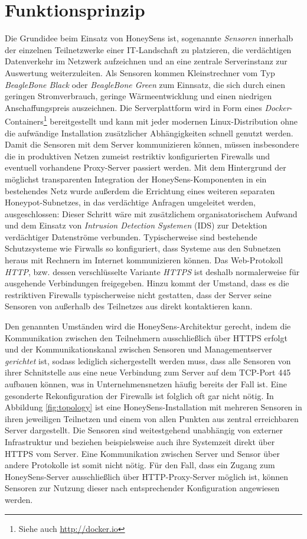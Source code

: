 \documentclass[12pt]{article}
\begin{document}
\part{Funktionsprinzip}
Die Grundidee beim Einsatz von HoneySens ist, sogenannte \textit{Sensoren} innerhalb der einzelnen Teilnetzwerke einer IT-Landschaft zu platzieren, die verdächtigen Datenverkehr im Netzwerk aufzeichnen und an eine zentrale Serverinstanz zur Auswertung weiterzuleiten. Als Sensoren kommen Kleinstrechner vom Typ \textit{BeagleBone Black} oder \textit{BeagleBone Green} zum Einnsatz, die sich durch einen geringen Stromverbrauch, geringe Wärmeentwicklung und einen niedrigen Anschaffungspreis auszeichnen. Die Serverplattform wird in Form eines \textit{Docker}-Containers\footnote{Siehe auch \url{http://docker.io}} bereitgestellt und kann mit jeder modernen Linux-Distribution ohne die aufwändige Installation zusätzlicher Abhängigkeiten schnell genutzt werden. Damit die Sensoren mit dem Server kommunizieren können, müssen insbesondere die in produktiven Netzen zumeist restriktiv konfigurierten Firewalls und eventuell vorhandene Proxy-Server passiert werden. Mit dem Hintergrund der möglichst transparenten Integration der HoneySens-Komponenten in ein bestehendes Netz wurde außerdem die Errichtung eines weiteren separaten Honeypot-Subnetzes, in das verdächtige Anfragen umgeleitet werden, ausgeschlossen: Dieser Schritt wäre mit zusätzlichem organisatorischem Aufwand und dem Einsatz von \textit{Intrusion Detection Systemen} (IDS) zur Detektion verdächtiger Datenströme verbunden. Typischerweise sind bestehende Schutzsysteme wie Firwalls so konfiguriert, dass Systeme aus den Subnetzen heraus mit Rechnern im Internet kommunizieren können. Das Web-Protokoll \textit{HTTP}, bzw. dessen verschlüsselte Variante \textit{HTTPS} ist deshalb normalerweise für ausgehende Verbindungen freigegeben. Hinzu kommt der Umstand, dass es die restriktiven Firewalls typischerweise nicht gestatten, dass der Server seine Sensoren von außerhalb des Teilnetzes aus direkt kontaktieren kann.

Den genannten Umständen wird die HoneySens-Architektur gerecht, indem die Kommunikation zwischen den Teilnehmern ausschließlich über HTTPS erfolgt und der Kommunikationskanal zwischen Sensoren und Managementserver \textit{gerichtet} ist, sodass lediglich sichergestellt werden muss, dass alle Sensoren von ihrer Schnitstelle aus eine neue Verbindung zum Server auf dem TCP-Port 445 aufbauen können, was in Unternehmensnetzen häufig bereits der Fall ist. Eine gesonderte Rekonfiguration der Firewalls ist folglich oft gar nicht nötig. In Abbildung \ref{fig:topology} ist eine HoneySens-Installation mit mehreren Sensoren in ihren jeweiligen Teilnetzen und einem von allen Punkten aus zentral erreichbaren Server dargestellt. Die Sensoren sind weitestgehend unabhängig von externer Infrastruktur und beziehen beispielsweise auch ihre Systemzeit direkt über HTTPS vom Server. Eine Kommunikation zwischen Server und Sensor über andere Protokolle ist somit nicht nötig. Für den Fall, dass ein Zugang zum HoneySens-Server ausschließlich über HTTP-Proxy-Server möglich ist, können Sensoren zur Nutzung dieser nach entsprechender Konfiguration angewiesen werden.
\end{document}
